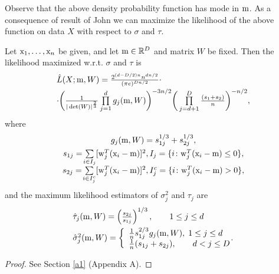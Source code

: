 Observe that the above density probability function has mode in $\mathrm{m}$.
As a consequence of result of John \cite{john1982three} we can maximize the likelihood of the above function on data $X$ with respect to $\sigma$ and $\tau$.

\begin{theorem}\label{the:min}
Let $\mathrm{x}_1,\ldots,\mathrm{x}_n$ be given, and let $\mathrm{m} \in \mathbb{R}^D$ and matrix $W$
be fixed.  
Then the likelihood maximized w.r.t. $\sigma$ and $\tau$ is
\begin{equation}\label{eq:1}
\begin{array}{l}
 \hat{L}(X;\mathrm{m},W) =   \frac{ 2^{(d-D/2)n} n^{dn/2} }{(\pi e)^{Dn/2}} \cdot \\[1ex]
 \cdot \bigg( \frac{1}{|\det(W)|^{\frac{2}{3}}} \prod\limits_{j=1}^{d} g_{j}(\mathrm{m},W) \bigg)^{-3n/2} 
\bigg( \prod\limits_{j=d+1}^{D} \frac{(s_1+s_2)}{n} \bigg)^{-n/2},
\end{array}
\end{equation}
where
$$
\begin{array}{c}
{g}_{j}(\mathrm{m},W) = {s}_{1j}^{1/3} + {s}_{2j}^{1/3},
\\[1ex]
{s}_{1j}= \! \sum\limits_{i \in I_j}[ \mathrm{w}_{j}^T (\mathrm{x}_i-\mathrm{m})]^2,  {I}_j=\{ i  \colon \mathrm{w}_{j}^T (\mathrm{x}_i-\mathrm{m}) \leq 0 \},
\\[1ex]
{s}_{2j}= \! \sum\limits_{i \in I_j^c}[ \mathrm{w}_{j}^T (\mathrm{x}_i-\mathrm{m})]^2, {I}_j^c=\{ i \colon  \mathrm{w}_{j}^T (\mathrm{x}_i-\mathrm{m}) > 0 \},
\end{array}
$$
and the maximum likelihood estimators of $\sigma_{j}^2$ and $\tau_{j}$ are
\begin{equation}\label{eq:est}
\begin{array}{l}
\hat \tau_{j}(\mathrm{m},W)=\left(\frac{s_{2j}}{s_{1j}}\right)^{1/3}, \qquad 1 \leq j \leq d\\[6px]
\hat \sigma_j^2(\mathrm{m},W) = \left\{ \begin{array}{l}
\tfrac{1}{n} s_{1j}^{2/3} g_{j}(\mathrm{m},W), \; 1 \leq j \leq d\\
\tfrac{1}{n} (s_{1j}+s_{2j}), \qquad d < j \leq D\\
\end{array} \right. \!\!\!\!.
\end{array}
\end{equation}
\end{theorem}

\begin{proof}
See Section \ref{a1} (Appendix A).
\end{proof}

